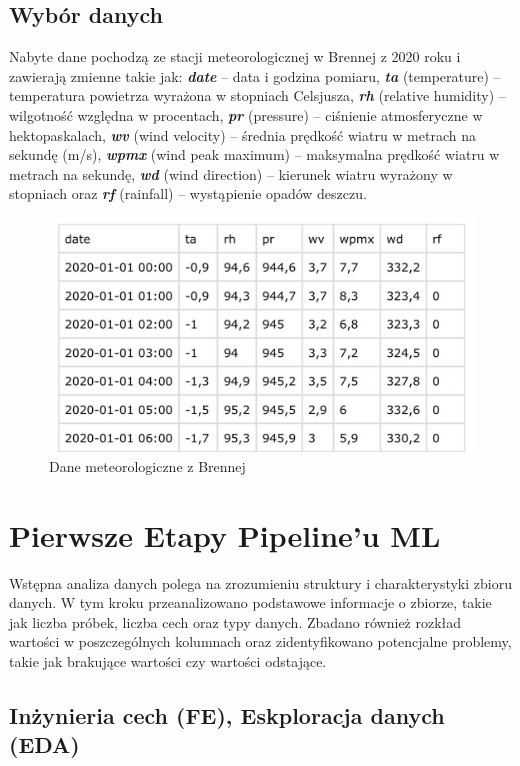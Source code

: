 \documentclass[10pt,a4paper]{article}
\begin{document}
\subsection*{Wybór danych}
Nabyte dane pochodzą ze stacji meteorologicznej w Brennej z 2020 roku i zawierają zmienne takie jak: 
\textbf{\textit{date}} – data i godzina pomiaru, 
\textbf{\textit{ta}} (temperature) – temperatura powietrza wyrażona w stopniach Celsjusza, 
\textbf{\textit{rh}} (relative humidity) – wilgotność względna w procentach, 
\textbf{\textit{pr}} (pressure) – ciśnienie atmosferyczne w hektopaskalach, 
\textbf{\textit{wv}} (wind velocity) – średnia prędkość wiatru w metrach na sekundę (m/s), 
\textbf{\textit{wpmx}} (wind peak maximum) – maksymalna prędkość wiatru w metrach na sekundę, 
\textbf{\textit{wd}} (wind direction) – kierunek wiatru wyrażony w stopniach oraz 
\textbf{\textit{rf}} (rainfall) – wystąpienie opadów deszczu.
\begin{figure}[h]
	\centering
	\includegraphics[scale=0.4]{Image.jpg}
	\caption{Dane meteorologiczne z Brennej}
	\label{fig:my_label}
\end{figure}

\section{Pierwsze Etapy Pipeline'u ML}
Wstępna analiza danych polega na zrozumieniu struktury i charakterystyki zbioru danych. W tym kroku przeanalizowano podstawowe informacje o zbiorze, takie jak liczba próbek, liczba cech oraz typy danych. Zbadano również rozkład wartości w poszczególnych kolumnach oraz zidentyfikowano potencjalne problemy, takie jak brakujące wartości czy wartości odstające.

\vspace{1.5em} 

\subsection{Inżynieria cech (FE), Eskploracja danych (EDA)}
\vspace{1.5em} 
\end{document}
